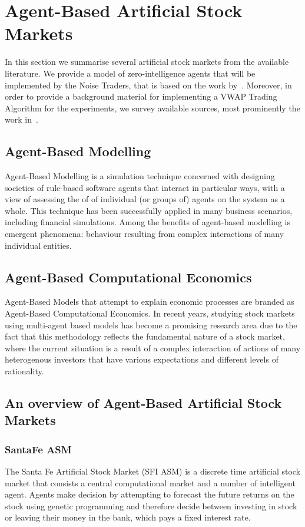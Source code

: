 \section{Agent-Based Artificial Stock Markets}
\label{Chapters/Background/Agent-Based-Modelling}

In this section we summarise several artificial stock markets from the available literature. We provide a model of zero-intelligence agents that will be implemented by the Noise Traders, that is based on the work by~\citet[chap.~4]{Gilles2006}. Moreover, in order to provide a background material for implementing a VWAP Trading Algorithm for the experiments, we survey available sources, most prominently the work in~\cite{Coggins2006, Kakade2004}. 

\subsection{Agent-Based Modelling}
Agent-Based Modelling is a simulation technique concerned with designing societies of rule-based software agents that interact in particular ways, with a view of assessing the of of individual (or groups of) agents on the system as a whole. This technique has been successfully applied in many business scenarios, including financial simulations. Among the benefits of agent-based modelling is emergent phenomena: behaviour resulting from complex interactions of many individual entities.

\subsection{Agent-Based Computational Economics}
Agent-Based Models that attempt to explain economic processes are branded as Agent-Based Computational Economics. In recent years, studying stock markets using multi-agent based models has become a promising research area due to the fact that this methodology reflects the fundamental nature of a stock market, where the current situation is a result of a complex interaction of actions of many heterogenous investors that have various expectations and different levels of rationality.

\subsection{An overview of Agent-Based Artificial Stock Markets}

\subsubsection*{SantaFe ASM~\citep{Lebaron2002, Lebaron99}}
The Santa Fe Artificial Stock Market (SFI ASM) is a discrete time artificial stock market that consists a central computational market and a number of intelligent agent. Agents make decision by attempting to forecast the future returns on the stock using genetic programming and therefore decide between investing in stock or leaving their money in the bank, which pays a fixed interest rate.

